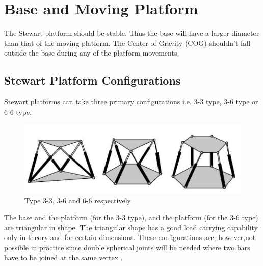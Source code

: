 \section{Base and Moving Platform}
 The Stewart platform should be stable. Thus the base will have a larger diameter than that of the moving platform. The Center of Gravity (COG) shouldn't fall outside the base during any of the platform movements.
\subsection{Stewart Platform Configurations}
Stewart platforms can take three primary configurations i.e. 3-3 type, 3-6 type or 6-6 type.
\begin{center}
	\begin{figure}[H]
	\centering
	\includegraphics{Figures/stewart}
	\caption[Configurations]{Type 3-3, 3-6 and 6-6 respectively
	\cite{fernandes_design_nodate}}
	\end{figure}
\end{center}
The base and the platform (for the 3-3 type), and the platform (for the 3-6 type) are triangular in shape. The triangular shape has a good load carrying capability only in theory and for certain dimensions. These configurations are, however,not possible in practice since double spherical joints will be needed where two bars have to be joined at the same vertex
\cite{fernandes_design_nodate}.

